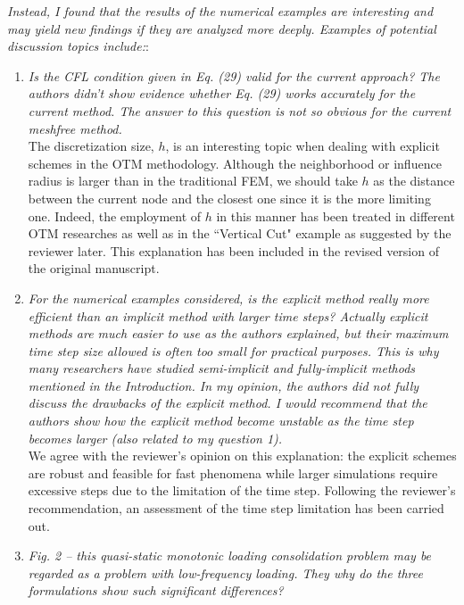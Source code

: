 \documentclass[12pt]{article}
\begin{document}
\textit{Instead, I found that the results of the numerical examples are interesting and may yield new findings if they are analyzed more deeply. Examples of potential discussion topics include:}:

\begin{enumerate}

\item \textit{Is the CFL condition given in Eq. (29) valid for the current approach? The authors didn't show evidence whether Eq. (29) works accurately for the current method. The answer to this question is not so obvious for the current meshfree method.}\\

The discretization size, $h$, is an interesting topic when dealing with explicit schemes in the OTM methodology. Although the neighborhood or influence radius is larger than in the traditional FEM, we should take $h$ as the distance between the current node and the closest one since it is the more limiting one. Indeed, the employment of $h$ in this manner has been treated in different OTM researches as well as in the ``Vertical Cut" example as suggested by the reviewer later. This explanation has been included in the revised version of the original manuscript.


\item \textit{For the numerical examples considered, is the explicit method really more efficient than an implicit method with larger time steps? Actually explicit methods are much easier to use as the authors explained, but their maximum time step size allowed is often too small for practical purposes. This is why many researchers have studied semi-implicit and fully-implicit methods mentioned in the Introduction. In my opinion, the authors did not fully discuss the drawbacks of the explicit method. I would recommend that the authors show how the explicit method become unstable as the time step becomes larger (also related to my question 1).}\\

We agree with the reviewer's opinion on this explanation: the explicit schemes are robust and feasible for fast phenomena while larger simulations require excessive steps due to the limitation of the time step. Following the reviewer's recommendation, an assessment of the time step limitation has been carried out.


\item \textit{Fig. 2 -- this quasi-static monotonic loading consolidation problem may be regarded as a problem with low-frequency loading. They why do the three formulations show such significant differences?}\\


\end{enumerate}
\end{document}
